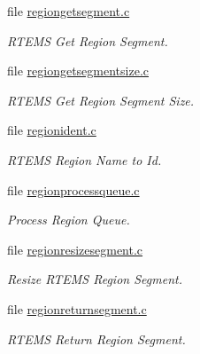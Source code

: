 \begin{DoxyCompactItemize}
file \mbox{\hyperlink{regiongetsegment_8c}{regiongetsegment.\+c}}
\begin{DoxyCompactList}\small\item\em R\+T\+E\+MS Get Region Segment. \end{DoxyCompactList}\item 
file \mbox{\hyperlink{regiongetsegmentsize_8c}{regiongetsegmentsize.\+c}}
\begin{DoxyCompactList}\small\item\em R\+T\+E\+MS Get Region Segment Size. \end{DoxyCompactList}\item 
file \mbox{\hyperlink{regionident_8c}{regionident.\+c}}
\begin{DoxyCompactList}\small\item\em R\+T\+E\+MS Region Name to Id. \end{DoxyCompactList}\item 
file \mbox{\hyperlink{regionprocessqueue_8c}{regionprocessqueue.\+c}}
\begin{DoxyCompactList}\small\item\em Process Region Queue. \end{DoxyCompactList}\item 
file \mbox{\hyperlink{regionresizesegment_8c}{regionresizesegment.\+c}}
\begin{DoxyCompactList}\small\item\em Resize R\+T\+E\+MS Region Segment. \end{DoxyCompactList}\item 
file \mbox{\hyperlink{regionreturnsegment_8c}{regionreturnsegment.\+c}}
\begin{DoxyCompactList}\small\item\em R\+T\+E\+MS Return Region Segment. \end{DoxyCompactList}\end{DoxyCompactItemize}
